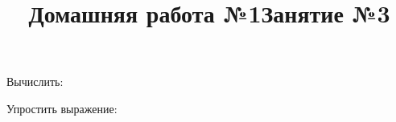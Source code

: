 \newpage
\title{Домашняя работа №1}
\begin{listofex}
	\item {}
	\item {}
	\item {}
	\item {}
	\item {}
	\item Вычислить:
	\begin{enumcols}[itemcolumns=3]
		\item {}
		\item {}
		\item {}
	\end{enumcols}
	\item {}
	\item {}
	\item {}
	\item {}
	\item {}
	\item Упростить выражение:
	\begin{enumcols}[itemcolumns=2]
		\item {}
		\item {}
	\end{enumcols}
	\item {}
\end{listofex}
\newpage
\title{Занятие №3}
